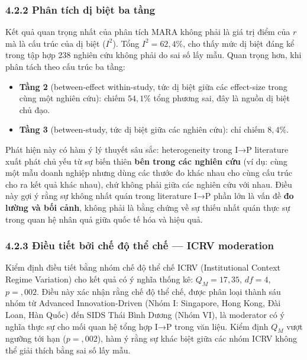 \documentclass[12pt,a4paper]{article}
\providecommand{\tightlist}{\setlength{\itemsep}{0pt}\setlength{\parskip}{0pt}}
\begin{document}
\hypertarget{422-phuxe2n-tuxedch-dux1ecb-biux1ec7t-ba-tux1ea7ng}{%
\subsubsection{4.2.2 Phân tích dị biệt ba
tầng}\label{422-phuxe2n-tuxedch-dux1ecb-biux1ec7t-ba-tux1ea7ng}}

Kết quả quan trọng nhất của phân tích MARA không phải là giá trị điểm
của \(r\) mà là cấu trúc của dị biệt (\(I^2\)). Tổng \(I^2 = 62{,}4\%\),
cho thấy mức dị biệt đáng kể trong tập hợp 238 nghiên cứu không phải do
sai số lấy mẫu. Quan trọng hơn, khi phân tách theo cấu trúc ba tầng:

\begin{itemize}
\tightlist
\item
  \textbf{Tầng 2} (between-effect within-study, tức dị biệt giữa các
  effect-size trong cùng một nghiên cứu): chiếm \(54{,}1\%\) tổng phương
  sai, đây là nguồn dị biệt chủ đạo.
\item
  \textbf{Tầng 3} (between-study, tức dị biệt giữa các nghiên cứu): chỉ
  chiếm \(8{,}4\%\).
\end{itemize}

Phát hiện này có hàm ý lý thuyết sâu sắc: heterogeneity trong I→P
literature xuất phát chủ yếu từ sự biến thiên \textbf{bên trong các
nghiên cứu} (ví dụ: cùng một mẫu doanh nghiệp nhưng dùng các thước đo
khác nhau cho cùng cấu trúc cho ra kết quả khác nhau), chứ không phải
giữa các nghiên cứu với nhau. Điều này gợi ý rằng sự không nhất quán
trong literature I→P phần lớn là vấn đề \textbf{đo lường và bối cảnh},
không phải là bằng chứng về sự thiếu nhất quán thực sự trong quan hệ
nhân quả giữa quốc tế hóa và hiệu quả.

\hypertarget{423-ux111iux1ec1u-tiux1ebft-bux1edfi-chux1ebf-ux111ux1ed9-thux1ec3-chux1ebf--icrv-moderation}{%
\subsubsection{4.2.3 Điều tiết bởi chế độ thể chế --- ICRV
moderation}\label{423-ux111iux1ec1u-tiux1ebft-bux1edfi-chux1ebf-ux111ux1ed9-thux1ec3-chux1ebf--icrv-moderation}}

Kiểm định điều tiết bằng nhóm chế độ thể chế ICRV (Institutional Context
Regime Variation) cho kết quả có ý nghĩa thống kê: \(Q_M = 17{,}35\),
\(df = 4\), \(p = {,}002\). Điều này xác nhận rằng chế độ thể chế, được
phân loại thành sáu nhóm từ Advanced Innovation-Driven (Nhóm I:
Singapore, Hong Kong, Đài Loan, Hàn Quốc) đến SIDS Thái Bình Dương (Nhóm
VI), là moderator có ý nghĩa thực sự cho mối quan hệ tổng hợp I→P trong
văn liệu. Kiểm định \(Q_M\) vượt ngưỡng tới hạn (\(p = {,}002\)), hàm ý
rằng sự khác biệt giữa các nhóm ICRV không thể giải thích bằng sai số
lấy mẫu.
\end{document}
